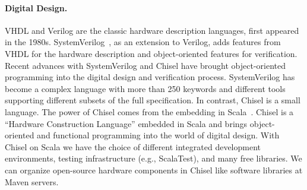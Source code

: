 \documentclass[fleqn,12pt]{article}
\begin{document}
\paragraph{Digital Design.}
VHDL and Verilog are the classic hardware description languages, first appeared in the 1980s.
SystemVerilog~\cite{SystemVerilog}, as an extension to Verilog, adds features from VHDL
for the hardware description and object-oriented features for verification.
Recent advances with SystemVerilog and Chisel \cite{chisel:dac2012, chisel:book} have
brought object-oriented programming into the digital design and verification process.
SystemVerilog has become a complex language with more than 250 keywords
and different tools supporting different subsets of the full specification.
In contrast, Chisel is a small language.
The power of Chisel comes from the embedding in Scala~\cite{Scala}.
Chisel is a ``Hardware Construction Language'' embedded in Scala and
brings object-oriented and functional programming into the world of digital design.
With Chisel on Scala we have the choice of different integrated development environments,
testing infrastructure (e.g., ScalaTest), and many free libraries.
We can organize open-source hardware components in Chisel like software
libraries at Maven servers.
\end{document}
